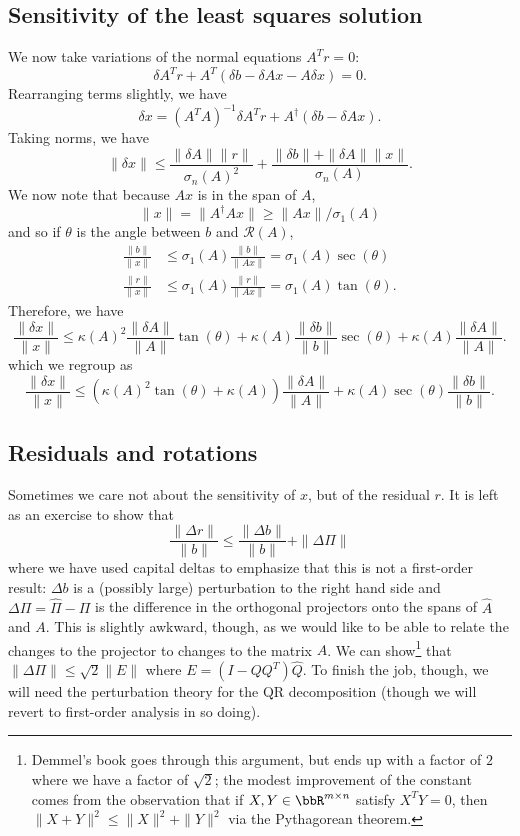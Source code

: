 \subsection{Sensitivity of the least squares solution}

We now take variations of the normal equations $A^T r = 0$:
\[
  \delta A^T r + A^T (\delta b - \delta A x - A \delta x) = 0.
\]
Rearranging terms slightly, we have
\[
  \delta x = (A^T A)^{-1} \delta A^T r + A^\dagger (\delta b - \delta A x).
\]
Taking norms, we have
\[
  \|\delta x\| \leq
    \frac{\|\delta A\| \|r\|}{\sigma_n(A)^2} +
    \frac{\|\delta b\| + \|\delta A\| \|x\|}{\sigma_n(A)}.
\]
We now note that because $Ax$ is in the span of $A$,
\[
  \|x\| = \|A^\dagger Ax\| \geq \|Ax\|/\sigma_1(A)
\]
and so if $\theta$ is the angle between $b$ and $\mathcal{R}(A)$,
\begin{align*}
  \frac{\|b\|}{\|x\|} &
    \leq \sigma_1(A) \frac{\|b\|}{\|Ax\|}
    = \sigma_1(A) \sec(\theta) \\
  \frac{\|r\|}{\|x\|} &
    \leq \sigma_1(A) \frac{\|r\|}{\|Ax\|}
    = \sigma_1(A) \tan(\theta).
\end{align*}
Therefore, we have
\[
  \frac{\|\delta x\|}{\|x\|} \leq
    \kappa(A)^2 \frac{\|\delta A\|}{\|A\|} \tan(\theta) +
    \kappa(A) \frac{\|\delta b\|}{\|b\|} \sec(\theta) +
    \kappa(A) \frac{\|\delta A\|}{\|A\|}.
\]
which we regroup as
\[
  \frac{\|\delta x\|}{\|x\|} \leq
    \left( \kappa(A)^2 \tan(\theta) + \kappa(A) \right) \frac{\|\delta A\|}{\|A\|} +
    \kappa(A) \sec(\theta) \frac{\|\delta b\|}{\|b\|}.
\]


\subsection{Residuals and rotations}

Sometimes we care not about the sensitivity of $x$, but of the
residual $r$.  It is left as an exercise to show that
\[
  \frac{\|\Delta r\|}{\|b\|}
  \leq \frac{\|\Delta b\|}{\|b\|} + \|\Delta \Pi\|
\]
where we have used capital deltas to emphasize that this is not
a first-order result:
$\Delta b$ is a (possibly large) perturbation to the right hand side
and $\Delta \Pi = \hat{\Pi}-\Pi$ is the difference in the orthogonal
projectors onto the spans of $\hat{A}$ and $A$.  This is slightly awkward,
though, as we would like to be able to relate the changes to the projector
to changes to the matrix $A$.  We can show\footnote{%
Demmel's book goes through this argument, but ends up with a factor
of $2$ where we have a factor of $\sqrt{2}$; the modest improvement
of the constant comes from the observation that if
$X, Y \in \bbR^{m \times n}$ satisfy $X^T Y = 0$, then
$\|X+Y\|^2 \leq \|X\|^2 + \|Y\|^2$ via the Pythagorean theorem.
} that
$\|\Delta \Pi\| \leq \sqrt{2} \|E\|$ where
$E = (I-Q Q^T) \hat{Q}$.  To finish the job, though, we will need
the perturbation theory for the
QR decomposition (though we will revert to first-order analysis in
so doing).

